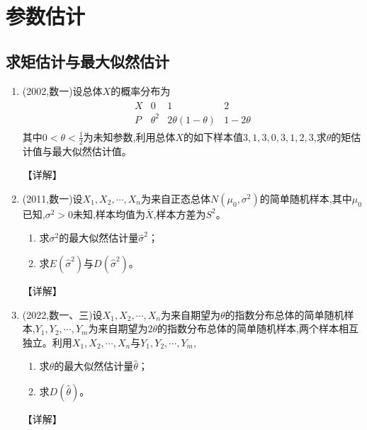 \documentclass[12pt, a4paper, oneside, UTF8]{ctexbook}
\begin{document}
% 
\else
\fi

\chapter{参数估计}

\section{求矩估计与最大似然估计}

\begin{enumerate}[label=\arabic*.]
    \item (2002,数一)设总体$X$的概率分布为
    \begin{align*}
        \begin{array}{c|ccc}
        X & 0 & 1 & 2 \\
        \hline
        P & \theta^2 & 2\theta(1-\theta) & 1-2\theta
        \end{array}
    \end{align*}
    其中$0<\theta<\frac{1}{2}$为未知参数,利用总体$X$的如下样本值$3,1,3,0,3,1,2,3$,求$\theta$的矩估计值与最大似然估计值。
    
    \begin{solution}
    【详解】
    \end{solution}
    
    \item (2011,数一)设$X_1,X_2,\cdots,X_n$为来自正态总体$N(\mu_0,\sigma^2)$的简单随机样本,其中$\mu_0$已知,$\sigma^2>0$未知,样本均值为$\bar{X}$,样本方差为$S^2$。
    \begin{enumerate}
        \item 求$\sigma^2$的最大似然估计量$\hat{\sigma}^2$；
        \item 求$E(\hat{\sigma}^2)$与$D(\hat{\sigma}^2)$。
    \end{enumerate}
    
    \begin{solution}
    【详解】
    \end{solution}
    
    \item (2022,数一、三)设$X_1,X_2,\cdots,X_n$为来自期望为$\theta$的指数分布总体的简单随机样本,$Y_1,Y_2,\cdots,Y_m$为来自期望为$2\theta$的指数分布总体的简单随机样本,两个样本相互独立。利用$X_1,X_2,\cdots,X_n$与$Y_1,Y_2,\cdots,Y_m$,
    \begin{enumerate}
        \item 求$\theta$的最大似然估计量$\hat{\theta}$；
        \item 求$D(\hat{\theta})$。
    \end{enumerate}
    
    \begin{solution}
    【详解】
    \end{solution}
\end{enumerate}
\end{document}
